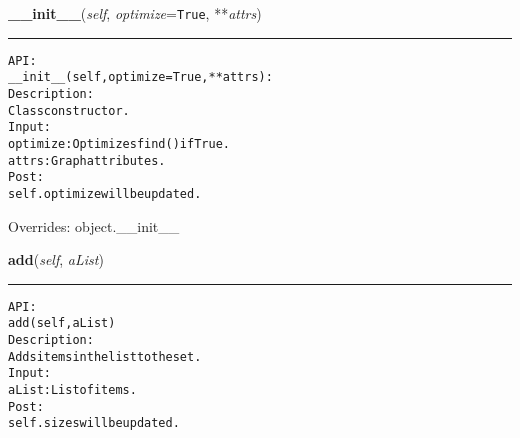 \hspace{.8\funcindent}\begin{boxedminipage}{\funcwidth}

    \raggedright \textbf{\_\_init\_\_}(\textit{self}, \textit{optimize}={\tt True}, **\textit{attrs})

    \vspace{-1.5ex}

    \rule{\textwidth}{0.5\fboxrule}
\setlength{\parskip}{2ex}
\begin{alltt}

API:
    \_\_init\_\_(self, optimize = True, **attrs):
Description:
    Class constructor.
Input:
    optimize: Optimizes find() if True.
    attrs: Graph attributes.
Post:
    self.optimize will be updated.
\end{alltt}

\setlength{\parskip}{1ex}
      Overrides: object.\_\_init\_\_

    \end{boxedminipage}

    \label{coinor:gimpy:graph:DisjointSet:add}

    \vspace{0.5ex}

\hspace{.8\funcindent}\begin{boxedminipage}{\funcwidth}

    \raggedright \textbf{add}(\textit{self}, \textit{aList})

    \vspace{-1.5ex}

    \rule{\textwidth}{0.5\fboxrule}
\setlength{\parskip}{2ex}
\begin{alltt}

API:
    add(self, aList)
Description:
    Adds items in the list to the set.
Input:
    aList: List of items.
Post:
    self.sizes will be updated.
\end{alltt}

\setlength{\parskip}{1ex}
    \end{boxedminipage}

    \label{coinor:gimpy:graph:DisjointSet:union}

